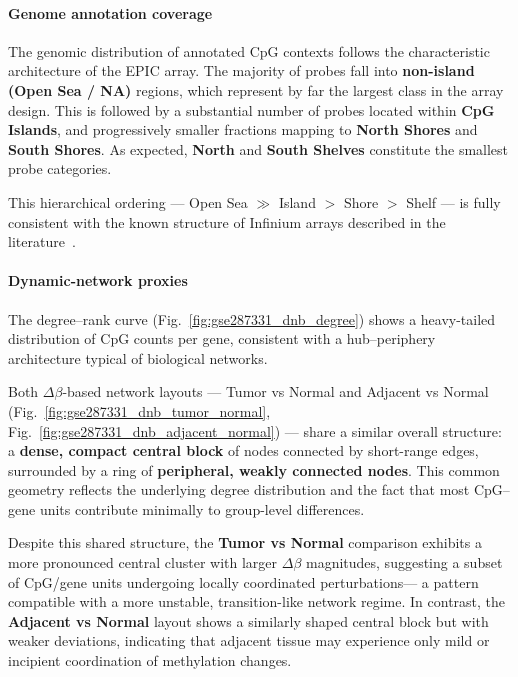 \documentclass[10pt]{extarticle}
\begin{document}
\paragraph{Genome annotation coverage}
\label{par:gse287331_manifest}

The genomic distribution of annotated CpG contexts follows the characteristic 
architecture of the EPIC array.  
The majority of probes fall into \textbf{non-island (Open Sea / NA)} regions, which 
represent by far the largest class in the array design.  
This is followed by a substantial number of probes located within \textbf{CpG Islands}, 
and progressively smaller fractions mapping to \textbf{North Shores} and 
\textbf{South Shores}.  
As expected, \textbf{North} and \textbf{South Shelves} constitute the smallest probe 
categories.

This hierarchical ordering — Open Sea $\gg$ Island $>$ Shore $>$ Shelf — is fully 
consistent with the known structure of Infinium arrays described in the literature~\cite{zhou2017, pidsley2016}.  


\paragraph{Dynamic-network proxies}
\label{par:gse287331_dnb_proxies}

The degree–rank curve 
(Fig.~\ref{fig:gse287331_dnb_degree}) shows a heavy-tailed distribution of CpG counts 
per gene, consistent with a hub–periphery architecture typical of biological networks.  

Both $\Delta\beta$-based network layouts — Tumor vs Normal and Adjacent vs Normal 
(Fig.~\ref{fig:gse287331_dnb_tumor_normal}, 
Fig.~\ref{fig:gse287331_dnb_adjacent_normal}) — share a similar overall structure:  
a \textbf{dense, compact central block} of nodes connected by short-range edges, 
surrounded by a ring of \textbf{peripheral, weakly connected nodes}.  
This common geometry reflects the underlying degree distribution and the fact that most 
CpG–gene units contribute minimally to group-level differences.

Despite this shared structure, the \textbf{Tumor vs Normal} comparison exhibits a more 
pronounced central cluster with larger $\Delta\beta$ magnitudes, suggesting a subset of 
CpG/gene units undergoing locally coordinated perturbations— a pattern compatible with a 
more unstable, transition-like network regime.  
In contrast, the \textbf{Adjacent vs Normal} layout shows a similarly shaped central block 
but with weaker deviations, indicating that adjacent tissue may experience only mild or 
incipient coordination of methylation changes.
\end{document}
